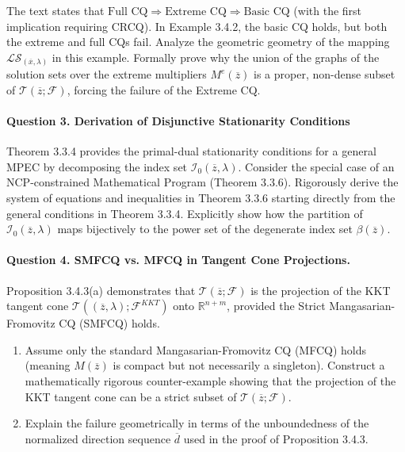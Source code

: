 \documentclass[pdflatex,sn-mathphys-num]{sn-jnl}%
\theoremstyle{definition}
\begin{document}
    The text states that $\text{Full CQ} \Rightarrow \text{Extreme CQ} \Rightarrow \text{Basic CQ}$ (with the first implication requiring CRCQ). 
    In Example 3.4.2, the basic CQ holds, but both the extreme and full CQs fail. 
    Analyze the geometric geometry of the mapping $\mathcal{LS}_{(\overline{x},\lambda)}$ in this example. Formally prove why the union of the graphs of the solution sets over the extreme multipliers $M^e(\overline{z})$ is a proper, non-dense subset of $\mathcal{T}(\overline{z}; \mathcal{F})$, forcing the failure of the Extreme CQ.

    \paragraph{Question 3. Derivation of Disjunctive Stationarity Conditions}
    Theorem 3.3.4 provides the primal-dual stationarity conditions for a general MPEC by decomposing the index set $\mathcal{I}_0(\overline{z},\lambda)$. 
    Consider the special case of an NCP-constrained Mathematical Program (Theorem 3.3.6). Rigorously derive the system of equations and inequalities in Theorem 3.3.6 starting directly from the general conditions in Theorem 3.3.4. Explicitly show how the partition of $\mathcal{I}_0(\overline{z},\lambda)$ maps bijectively to the power set of the degenerate index set $\beta(\overline{z})$.

    \paragraph{Question 4. SMFCQ vs. MFCQ in Tangent Cone Projections.}
    Proposition 3.4.3(a) demonstrates that $\mathcal{T}(\overline{z}; \mathcal{F})$ is the projection of the KKT tangent cone $\mathcal{T}((\overline{z},\lambda); \mathcal{F}^{KKT})$ onto $\mathbb{R}^{n+m}$, provided the Strict Mangasarian-Fromovitz CQ (SMFCQ) holds.
    \begin{enumerate}
        \item Assume only the standard Mangasarian-Fromovitz CQ (MFCQ) holds (meaning $M(\overline{z})$ is compact but not necessarily a singleton). Construct a mathematically rigorous counter-example showing that the projection of the KKT tangent cone can be a strict subset of $\mathcal{T}(\overline{z}; \mathcal{F})$.
        \item Explain the failure geometrically in terms of the unboundedness of the normalized direction sequence $\overline{d}$ used in the proof of Proposition 3.4.3.
    \end{enumerate}
\end{document}
